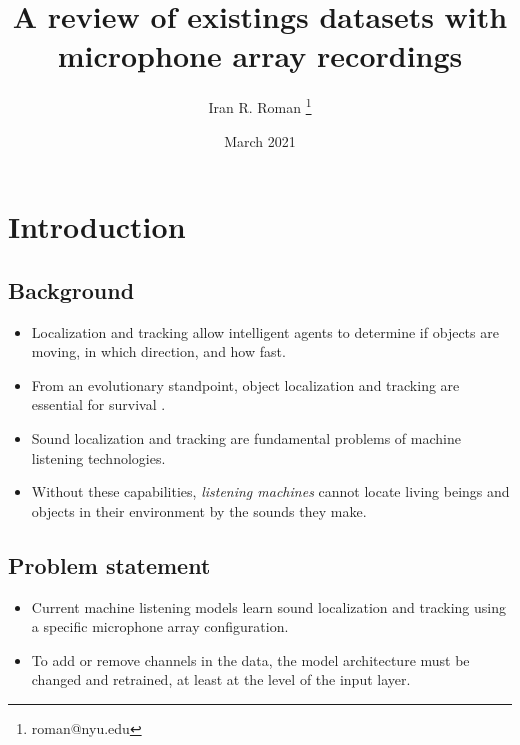 \documentclass[14pt, oneside]{extarticle}
\title{A review of existings datasets with microphone array recordings}
\author{Iran R. Roman \thanks{roman@nyu.edu}}
\affil{Music and Audio Research Laboratory, New York University}
\date{March 2021}
\begin{document}
\maketitle
\tableofcontents

\vspace{.25in}

\section{Introduction}

\subsection{Background}

\begin{itemize}

\item Localization and tracking allow intelligent agents to determine if objects are moving, in which direction, and how fast. 

\item From an evolutionary standpoint, object localization and tracking are essential for survival \cite{heffner2018evolution}.

\item Sound localization and tracking are fundamental problems of machine listening technologies.

\item Without these capabilities, {\it listening machines} cannot locate living beings and objects in their environment by the sounds they make. 

\end{itemize}

\subsection{Problem statement}

\begin{itemize}

\item Current machine listening models learn sound localization and tracking using a specific microphone array configuration. 

\item To add or remove channels in the data, the model architecture must be changed and retrained, at least at the level of the input layer.

\end{itemize}
\end{document}
